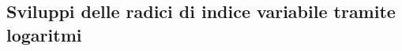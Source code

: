 \subsection{Sviluppi delle radici di indice variabile tramite logaritmi}
\label{sec:esercizi-taylor-e-asintotici-radici-n-esime-con-logaritmi}
